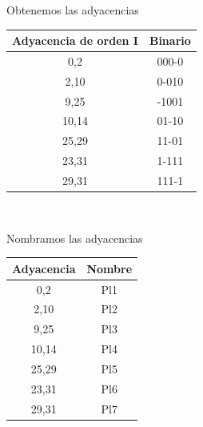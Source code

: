 \documentclass[a4paper,12pt]{article}
\begin{document}
\begin{enumerate}[label=\textcolor{teal}{\textbf{\arabic*.}}]
        Obtenemos las adyacencias\\

            \begin{table}[H]
            \centering
            \begin{tabular}{|c|c|}
                \hline
                Adyacencia de orden I & Binario\\ 
                \hline
                0,2 & 000-0 \\ 
                \hline 
                2,10 & 0-010 \\ 
                \hline 
                9,25 & -1001 \\
                \hline 
                10,14 & 01-10 \\ 
                \hline 
                25,29 & 11-01 \\ 
                \hline 
                23,31 & 1-111 \\ 
                \hline 
                29,31 & 111-1 \\ 
                \hline 
            \end{tabular}\\
        \end{table}

        Nombramos las adyacencias \\

            \begin{table}[H]
            \centering
            \begin{tabular}{|c|c|}
                \hline
                Adyacencia & Nombre\\ 
                \hline
                0,2 & Pl1\\ 
                \hline 
                2,10 & Pl2 \\ 
                \hline 
                9,25 & Pl3 \\
                \hline 
                10,14 & Pl4 \\ 
                \hline 
                25,29 & Pl5 \\ 
                \hline 
                23,31 & Pl6 \\ 
                \hline 
                29,31 & Pl7 \\ 
                \hline 
            \end{tabular}\\
        \end{table}
       

\end{enumerate}
\end{document}
